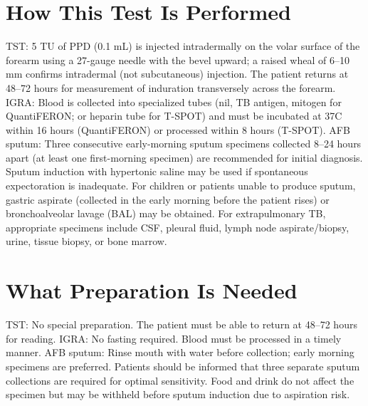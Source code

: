 \section*{How This Test Is Performed}
TST: 5 TU of PPD (0.1 mL) is injected intradermally on the volar surface of the forearm using a 27-gauge needle with the bevel upward; a raised wheal of 6--10 mm confirms intradermal (not subcutaneous) injection. The patient returns at 48--72 hours for measurement of induration transversely across the forearm. IGRA: Blood is collected into specialized tubes (nil, TB antigen, mitogen for QuantiFERON; or heparin tube for T-SPOT) and must be incubated at 37\textdegree{}C within 16 hours (QuantiFERON) or processed within 8 hours (T-SPOT). AFB sputum: Three consecutive early-morning sputum specimens collected 8--24 hours apart (at least one first-morning specimen) are recommended for initial diagnosis. Sputum induction with hypertonic saline may be used if spontaneous expectoration is inadequate. For children or patients unable to produce sputum, gastric aspirate (collected in the early morning before the patient rises) or bronchoalveolar lavage (BAL) may be obtained. For extrapulmonary TB, appropriate specimens include CSF, pleural fluid, lymph node aspirate/biopsy, urine, tissue biopsy, or bone marrow.

\section*{What Preparation Is Needed}
TST: No special preparation. The patient must be able to return at 48--72 hours for reading. IGRA: No fasting required. Blood must be processed in a timely manner. AFB sputum: Rinse mouth with water before collection; early morning specimens are preferred. Patients should be informed that three separate sputum collections are required for optimal sensitivity. Food and drink do not affect the specimen but may be withheld before sputum induction due to aspiration risk.

